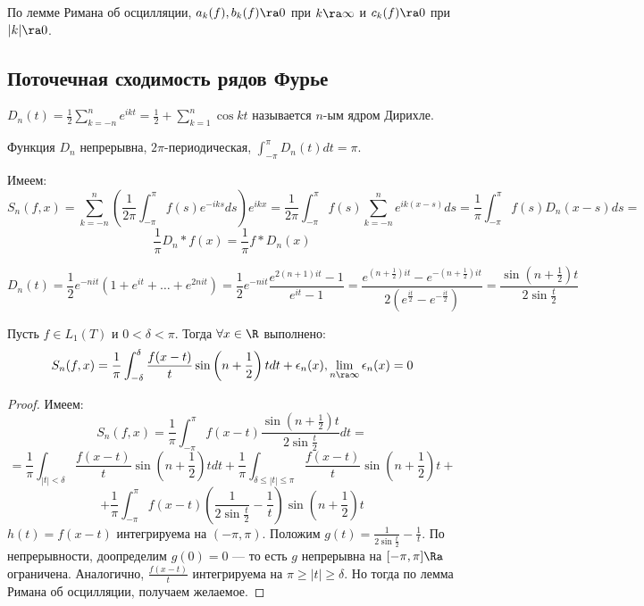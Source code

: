 \begin{note}
    По лемме Римана об осцилляции, \(a_k(f), b_k(f) \ra 0\) при \(k \ra \infty\) и \(c_k(f) \ra 0\) при \(|k| \ra 0\).
\end{note}

\subsection{Поточечная сходимость рядов Фурье}
\begin{definition}
    \(D_n(t) = \frac{1}{2}\sum_{k = -n}^n e^{ikt} = \frac{1}{2} + \sum_{k = 1}^n \cos kt\) называется \(n\)-ым ядром Дирихле.
\end{definition}

\begin{note}
    Функция \(D_n\) непрерывна, \(2\pi\)-периодическая, \(\int_{-\pi}^{\pi} D_n(t)dt = \pi\).
\end{note}

Имеем:
\[S_n(f, x) = \sum_{k = -n}^n\left( \frac{1}{2\pi}\int_{-\pi}^{\pi}f(s)e^{-iks}ds \right)e^{ikx} = \frac{1}{2\pi}\int_{-\pi}^\pi f(s)\sum_{k = -n}^n e^{ik(x - s)}ds = \frac{1}{\pi}\int_{-\pi}^{\pi} f(s)D_n(x - s)ds = \]
\[\frac{1}{\pi}D_n * f(x) = \frac{1}{\pi}f * D_n(x)\]

\[D_n(t) = \frac{1}{2}e^{-nit}\left( 1 + e^{it} + \dots + e^{2nit} \right) = \frac{1}{2}e^{-nit} \frac{e^{2(n + 1)it} - 1}{e^{it} - 1} = \frac{e^{\left( n + \frac{1}{2} \right)it} - e^{-\left( n + \frac{1}{2} \right)it}}{2 \left( e^{\frac{it}{2}} - e^{-\frac{it}{2}} \right)} = \frac{\sin\left( n + \frac{1}{2} \right)t}{2 \sin \frac{t}{2}}\]

\begin{lemma}
    Пусть \(f \in L_1(T)\) и \(0 < \delta < \pi\). Тогда \(\forall x \in \R\) выполнено:
    \[S_n(f, x) = \frac{1}{\pi}\int_{-\delta}^{\delta}\frac{f(x - t)}{t}\sin\left( n + \frac{1}{2} \right)t dt + \epsilon_n(x), \lim_{n \ra \infty} \epsilon_n(x) = 0\]
\end{lemma}
\begin{proof}
    Имеем:
    \[S_n(f, x) = \frac{1}{\pi}\int_{-\pi}^{\pi}f(x - t)\frac{\sin\left( n + \frac{1}{2} \right)t}{2\sin\frac{t}{2}}dt = \]
    \[ = \frac{1}{\pi}\int_{|t| < \delta} \frac{f(x - t)}{t}\sin\left( n + \frac{1}{2} \right)tdt + \frac{1}{\pi}\int_{\delta \le |t| \le \pi} \frac{f(x - t)}{t}\sin\left( n + \frac{1}{2} \right)t + \]
    \[+ \frac{1}{\pi}\int_{-\pi}^\pi f(x - t)\left( \frac{1}{2\sin \frac{t}{2}} - \frac{1}{t} \right)\sin\left( n + \frac{1}{2} \right)t\]
    \(h(t) = f(x - t)\) интегрируема на \((-\pi, \pi)\). Положим \(g(t) = \frac{1}{2\sin \frac{t}{2}} - \frac{1}{t}\). По непрерывности, доопределим \(g(0) = 0\) --- то есть \(g\) непрерывна на \([-\pi, \pi] \Ra\) ограничена.  Аналогично, \(\frac{f(x - t)}{t}\) интегрируема на \(\pi \ge |t| \ge \delta\). Но тогда по лемма Римана об осцилляции, получаем желаемое.
\end{proof}

